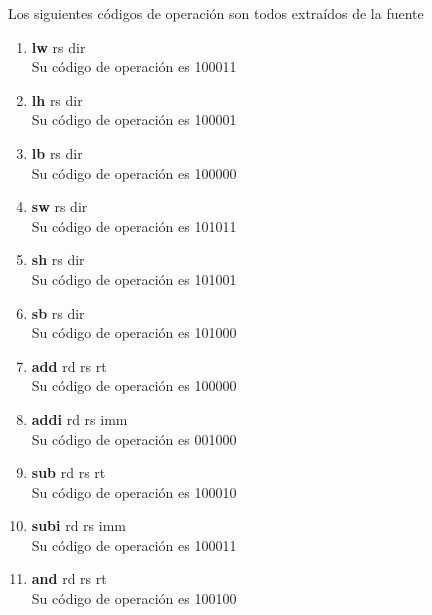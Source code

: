 \documentclass{article}
\begin{document}
\begin{enumerate}
{			Los siguientes códigos de operación son todos extraídos de la fuente \cite{manual}
			\begin{enumerate}
			\item{ \textbf{lw} rs dir\\
				Su código de operación es 100011  \\
			}
			
			\item{ \textbf{lh} rs dir\\
				Su código de operación es 100001 \\
			}
			
			\item{ \textbf{lb} rs dir\\
				Su código de operación es 100000  \\
			}
			
			\item{ \textbf{sw} rs dir\\
				Su código de operación es 101011  \\
			}
			
			\item{ \textbf{sh} rs dir\\
				Su código de operación es 101001\\
			}
			
			\item{ \textbf{sb} rs dir\\
				Su código de operación es 101000\\
			}
			
			\item{ \textbf{add} rd rs rt\\
				Su código de operación es 100000\\
			}
			
			\item{ \textbf{addi} rd rs imm\\
				Su código de operación es 001000\\
			}
			
			\item{ \textbf{sub} rd rs rt\\
				Su código de operación es 100010 \\
			}
			
			\item{ \textbf{subi} rd rs imm\\
				Su código de operación es 100011 \\
			}
			
			\item{ \textbf{and} rd rs rt\\
				Su código de operación es 100100\\ 
			}
			

\end{enumerate}}
\end{enumerate}
\end{document}
